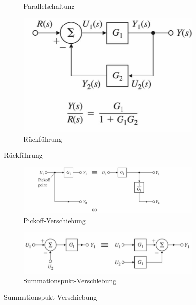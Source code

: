 \begin{tcolorbox}[colback=white!10!white,colframe=blue!50!black,title=Regeln]
\begin{figure}[H]
\begin{subfigure}{.3\textwidth}
	\caption{Parallelschaltung}
	\label{fig:parallel}
		\end{subfigure}%
			\begin{subfigure}{.3\textwidth}
				\centering
				\includegraphics[width=1\textwidth]{content/img/back}
				\caption{Rückführung}
				\label{fig:back}
			\end{subfigure}%
	\end{figure}
\begin{figure}[H]

			\begin{subfigure}{.5\textwidth}
			\centering
			\includegraphics[width=1\textwidth]{content/img/verschiebung_punkt}
			\caption{Pickoff-Verschiebung}
			\label{fig:pickoff}
			\end{subfigure}%
			\begin{subfigure}{.5\textwidth}
				\centering
				\includegraphics[width=1\textwidth]{content/img/sum_front}
				\caption{Summationspukt-Verschiebung}
				\label{fig:sum}
			\end{subfigure}%
			


\end{figure}
\end{tcolorbox}
